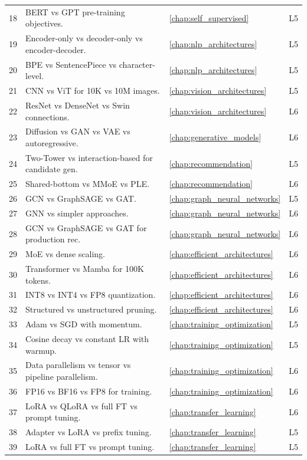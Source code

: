 \begin{longtable}{rp{8.5cm}ll}
18 & BERT vs GPT pre-training objectives. & \ref{chap:self_supervised} & L5 \\
19 & Encoder-only vs decoder-only vs encoder-decoder. & \ref{chap:nlp_architectures} & L5 \\
20 & BPE vs SentencePiece vs character-level. & \ref{chap:nlp_architectures} & L5 \\
21 & CNN vs ViT for 10K vs 10M images. & \ref{chap:vision_architectures} & L5 \\
22 & ResNet vs DenseNet vs Swin connections. & \ref{chap:vision_architectures} & L6 \\
23 & Diffusion vs GAN vs VAE vs autoregressive. & \ref{chap:generative_models} & L6 \\
24 & Two-Tower vs interaction-based for candidate gen. & \ref{chap:recommendation} & L5 \\
25 & Shared-bottom vs MMoE vs PLE. & \ref{chap:recommendation} & L6 \\
26 & GCN vs GraphSAGE vs GAT. & \ref{chap:graph_neural_networks} & L5 \\
27 & GNN vs simpler approaches. & \ref{chap:graph_neural_networks} & L6 \\
28 & GCN vs GraphSAGE vs GAT for production rec. & \ref{chap:graph_neural_networks} & L6 \\
29 & MoE vs dense scaling. & \ref{chap:efficient_architectures} & L6 \\
30 & Transformer vs Mamba for 100K tokens. & \ref{chap:efficient_architectures} & L6 \\
31 & INT8 vs INT4 vs FP8 quantization. & \ref{chap:efficient_architectures} & L6 \\
32 & Structured vs unstructured pruning. & \ref{chap:efficient_architectures} & L6 \\
33 & Adam vs SGD with momentum. & \ref{chap:training_optimization} & L5 \\
34 & Cosine decay vs constant LR with warmup. & \ref{chap:training_optimization} & L5 \\
35 & Data parallelism vs tensor vs pipeline parallelism. & \ref{chap:training_optimization} & L6 \\
36 & FP16 vs BF16 vs FP8 for training. & \ref{chap:training_optimization} & L6 \\
37 & LoRA vs QLoRA vs full FT vs prompt tuning. & \ref{chap:transfer_learning} & L6 \\
38 & Adapter vs LoRA vs prefix tuning. & \ref{chap:transfer_learning} & L5 \\
39 & LoRA vs full FT vs prompt tuning. & \ref{chap:transfer_learning} & L5 \\

\end{longtable}
